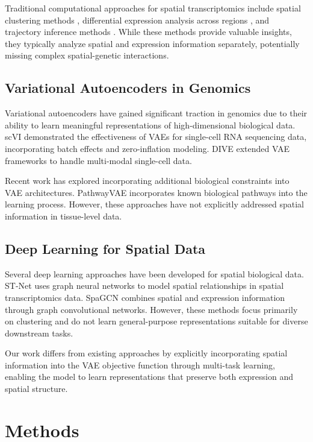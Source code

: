 \documentclass[11pt]{article}
\begin{document}
Traditional computational approaches for spatial transcriptomics include spatial clustering methods \cite{zhao2021spatial}, differential expression analysis across regions \cite{cable2021robust}, and trajectory inference methods \cite{saelens2019comparison}. While these methods provide valuable insights, they typically analyze spatial and expression information separately, potentially missing complex spatial-genetic interactions.

\subsection{Variational Autoencoders in Genomics}

Variational autoencoders have gained significant traction in genomics due to their ability to learn meaningful representations of high-dimensional biological data. scVI \cite{lopez2018deep} demonstrated the effectiveness of VAEs for single-cell RNA sequencing data, incorporating batch effects and zero-inflation modeling. DIVE \cite{rashid2021dive} extended VAE frameworks to handle multi-modal single-cell data.

Recent work has explored incorporating additional biological constraints into VAE architectures. PathwayVAE \cite{graving2021pathway} incorporates known biological pathways into the learning process. However, these approaches have not explicitly addressed spatial information in tissue-level data.

\subsection{Deep Learning for Spatial Data}

Several deep learning approaches have been developed for spatial biological data. ST-Net \cite{he2020stnet} uses graph neural networks to model spatial relationships in spatial transcriptomics data. SpaGCN \cite{hu2021spagcn} combines spatial and expression information through graph convolutional networks. However, these methods focus primarily on clustering and do not learn general-purpose representations suitable for diverse downstream tasks.

Our work differs from existing approaches by explicitly incorporating spatial information into the VAE objective function through multi-task learning, enabling the model to learn representations that preserve both expression and spatial structure.

\section{Methods}
\label{sec:methods}
\end{document}
